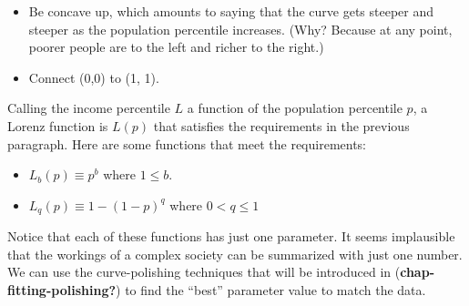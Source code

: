 \documentclass[
  letterpaper,
  DIV=11,
  numbers=noendperiod,
  oneside]{article}
\providecommand{\tightlist}{%
  \setlength{\itemsep}{0pt}\setlength{\parskip}{0pt}}\usepackage{longtable,booktabs,array}
\begin{document}
\begin{multicols}{2}
\begin{table}
\begin{minipage}[t]{\linewidth}
{}

\end{minipage}%
\newline
\begin{minipage}[t]{\linewidth}

{\centering 

\begin{itemize}
\tightlist
\item
  Be concave up, which amounts to saying that the curve gets steeper and
  steeper as the population percentile increases. (Why? Because at any
  point, poorer people are to the left and richer to the right.)
\item
  Connect (0,0) to (1, 1).
\end{itemize}

}

\end{minipage}%
\newline
\begin{minipage}[t]{\linewidth}

{\centering 

Calling the income percentile \(L\) a function of the population
percentile \(p\), a Lorenz function is \(L(p)\) that satisfies the
requirements in the previous paragraph. Here are some functions that
meet the requirements:

}

\end{minipage}%
\newline
\begin{minipage}[t]{\linewidth}

{\centering 

\begin{itemize}
\tightlist
\item
  \(L_b(p) \equiv p^b\) where \(1 \leq b\).
\item
  \(L_q(p) \equiv 1 - (1-p)^q\) where \(0 < q \leq 1\)
\end{itemize}

}

\end{minipage}%
\newline
\begin{minipage}[t]{\linewidth}

{\centering 

Notice that each of these functions has just one parameter. It seems
implausible that the workings of a complex society can be summarized
with just one number. We can use the curve-polishing techniques that
will be introduced in
(\textbf{chap-fitting-polishing?})
to find the ``best'' parameter value to match the data.

}
\end{minipage}
\end{table}
\end{multicols}
\end{document}
